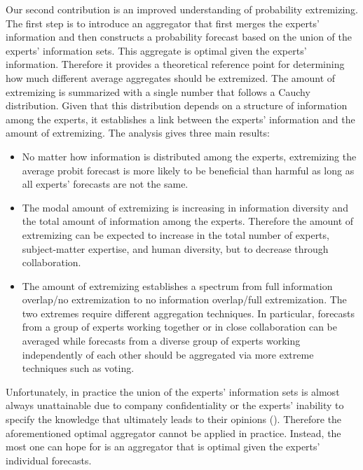 \documentclass[11pt]{article}
\theoremstyle{definition}
\theoremstyle{definition}
\begin{document}
Our second contribution is an improved understanding of probability extremizing. The first step is to introduce an aggregator that first merges the experts' information and then constructs a probability forecast based on the union of the experts' information sets. This aggregate is optimal given the experts' information. 
Therefore it provides a theoretical reference point for determining how much different average aggregates should be extremized. The amount of extremizing is summarized with a single number that follows a Cauchy distribution. Given that this distribution depends on a structure of information among the experts, it
establishes a link between the experts' information and the amount of extremizing. The analysis gives three main results:
\begin{itemize}
\item  No matter how information is distributed among the experts, extremizing the average probit forecast is more likely to be beneficial than harmful as long as all experts' forecasts are not the same.

\item The modal amount of extremizing is increasing in information diversity and the total amount of information among the experts. Therefore the amount of extremizing can be expected to increase in the total number of experts, subject-matter expertise, and human diversity, but to decrease through collaboration. 

\item The amount of extremizing establishes a spectrum from full information overlap/no extremization to no information overlap/full extremization. The two extremes require different aggregation techniques. In particular,
forecasts from a group of experts working together or in close collaboration can be averaged while forecasts from a diverse group of experts working independently of each other should be aggregated via more extreme techniques such as voting.
\end{itemize}
Unfortunately, in practice the union of the experts' information sets is almost always unattainable due to company confidentiality or the experts' inability to specify the knowledge that ultimately leads to their opinions (\citet{dawid1995coherent}). Therefore the aforementioned optimal aggregator cannot be applied in practice. Instead, the most one can hope for is an aggregator that is optimal given the experts' individual forecasts. 
\end{document}
